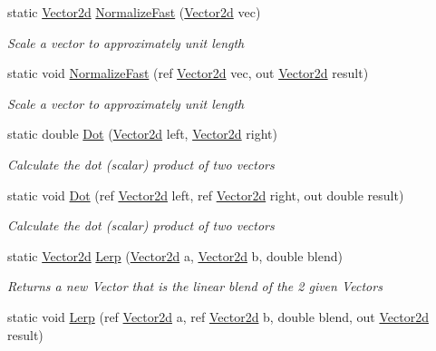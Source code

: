 \begin{DoxyCompactItemize}
static \hyperlink{struct_open_t_k_1_1_vector2d}{Vector2d} \hyperlink{struct_open_t_k_1_1_vector2d_a0e7a39a93a67fcfcd2d0044967d6cea4}{Normalize\-Fast} (\hyperlink{struct_open_t_k_1_1_vector2d}{Vector2d} vec)
\begin{DoxyCompactList}\small\item\em Scale a vector to approximately unit length \end{DoxyCompactList}\item 
static void \hyperlink{struct_open_t_k_1_1_vector2d_a19d77a95f855f644e51e47e681222c0a}{Normalize\-Fast} (ref \hyperlink{struct_open_t_k_1_1_vector2d}{Vector2d} vec, out \hyperlink{struct_open_t_k_1_1_vector2d}{Vector2d} result)
\begin{DoxyCompactList}\small\item\em Scale a vector to approximately unit length \end{DoxyCompactList}\item 
static double \hyperlink{struct_open_t_k_1_1_vector2d_a04f60a0ff453ecc042d11aa04650da9c}{Dot} (\hyperlink{struct_open_t_k_1_1_vector2d}{Vector2d} left, \hyperlink{struct_open_t_k_1_1_vector2d}{Vector2d} right)
\begin{DoxyCompactList}\small\item\em Calculate the dot (scalar) product of two vectors \end{DoxyCompactList}\item 
static void \hyperlink{struct_open_t_k_1_1_vector2d_a203f790daceb5dd391b3afcdaddfc6ca}{Dot} (ref \hyperlink{struct_open_t_k_1_1_vector2d}{Vector2d} left, ref \hyperlink{struct_open_t_k_1_1_vector2d}{Vector2d} right, out double result)
\begin{DoxyCompactList}\small\item\em Calculate the dot (scalar) product of two vectors \end{DoxyCompactList}\item 
static \hyperlink{struct_open_t_k_1_1_vector2d}{Vector2d} \hyperlink{struct_open_t_k_1_1_vector2d_a46089aefe12a5f0497582f6d1134febe}{Lerp} (\hyperlink{struct_open_t_k_1_1_vector2d}{Vector2d} a, \hyperlink{struct_open_t_k_1_1_vector2d}{Vector2d} b, double blend)
\begin{DoxyCompactList}\small\item\em Returns a new Vector that is the linear blend of the 2 given Vectors \end{DoxyCompactList}\item 
static void \hyperlink{struct_open_t_k_1_1_vector2d_a3e402184be7cdf45bb6517c4ad96edde}{Lerp} (ref \hyperlink{struct_open_t_k_1_1_vector2d}{Vector2d} a, ref \hyperlink{struct_open_t_k_1_1_vector2d}{Vector2d} b, double blend, out \hyperlink{struct_open_t_k_1_1_vector2d}{Vector2d} result)

\end{DoxyCompactItemize}
